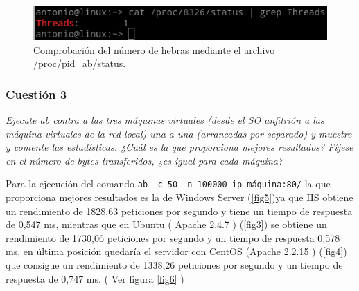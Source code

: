\begin{figure}[H]
  \begin{center}
    \includegraphics[width=1\textwidth]{imagenes/ab2}
    \caption{Comprobación del número de hebras mediante el archivo /proc/pid\_ab/status.}
    \label{fig12}
  \end{center}
\end{figure}


\subsubsection{Cuestión 3}
\textit{Ejecute ab contra a las tres máquinas virtuales (desde el SO anfitrión a las máquina virtuales de la red local) una a una (arrancadas por separado) y muestre y comente las estadísticas. ¿Cuál es la que proporciona mejores resultados? Fíjese en el número de bytes transferidos, ¿es igual para cada máquina?}
\newline

Para la ejecución del comando \texttt{ab -c 50 -n 100000 ip\_máquina:80/} la que proporciona mejores resultados es la de Windows Server (\cref{fig5})ya que IIS obtiene un rendimiento de 1828,63 peticiones por segundo y tiene un tiempo de respuesta de 0,547 ms, mientras que en Ubuntu ( Apache 2.4.7 ) (\cref{fig3}) se obtiene un rendimiento de 1730,06 peticiones por segundo y un tiempo de respuesta 0,578 ms, en última posición quedaría el servidor con CentOS (Apache 2.2.15 ) (\cref{fig4})  que consigue un rendimiento de 1338,26 peticiones por segundo y un tiempo de respuesta de 0,747 ms.\cite{ab} ( Ver figura \ref{fig6} )

